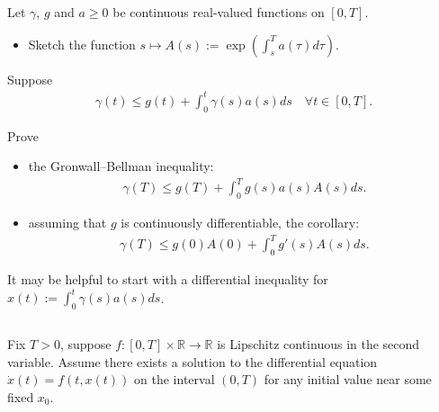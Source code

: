 \documentclass[12pt,a4paper]{article}
\newcommand{\from}{\colon}
\begin{document}
    
    Let $\gamma$, $g$ and $a \geq 0$ be continuous real-valued
    functions on $[0, T]$.
    
    \begin{itemize}
    \item
        Sketch 
        the function
        $
            s \mapsto A(s) :=
            \exp( \int_s^T a(\tau) d\tau )
        $.
    \end{itemize}
    
    Suppose 
    \begin{align}
        \gamma(t) 
        \leq 
        g(t) +
        \int_0^t \gamma(s) a(s) ds
        \quad
        \forall t \in [0, T]
        .
    \end{align}

    
    Prove
    
    \begin{itemize}
    \item 
        the Gronwall--Bellman inequality:
        \begin{align}
            \gamma(T) 
            \leq
            g(T) +
            \int_0^T g(s) a(s) A(s) ds
            .
        \end{align}
    \item
        assuming that $g$ is continuously differentiable,
        the corollary:
        \begin{align}
            \gamma(T) 
            \leq 
            g(0) A(0)
            +
            \int_0^T g'(s) A(s) ds
            .
        \end{align}
    \end{itemize}
        
    It may be helpful to
    start with a differential inequality for 
    $x(t) := \int_0^t \gamma(s) a(s) ds$.

    
    \subsection{}
    
    Fix $T > 0$,
    suppose $f \from [0, T] \times \mathbb{R} \to \mathbb{R}$
    is Lipschitz continuous in the second variable.
    Assume there exists a solution to
    the differential equation 
    $\dot{x}(t) = f(t, x(t))$ on the interval $(0, T)$
    for any initial value near some fixed $x_0$.
    
\end{document}
